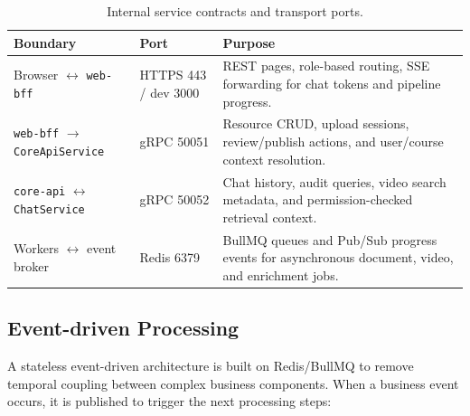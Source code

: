 \begin{table}[H]
    \centering
    \caption{Internal service contracts and transport ports.}
    \label{tab:grpc-service-summary}
    \begin{tabular}{|p{3.2cm}|p{2.6cm}|p{7.2cm}|}
        \hline
        \textbf{Boundary} & \textbf{Port} & \textbf{Purpose} \\
        \hline
        Browser $\leftrightarrow$ \texttt{web-bff}
            & HTTPS 443 / dev 3000
            & REST pages, role-based routing, SSE forwarding for chat tokens
              and pipeline progress. \\
        \hline
        \texttt{web-bff} $\to$ \texttt{CoreApiService}
            & gRPC 50051
            & Resource CRUD, upload sessions, review/publish actions, and
              user/course context resolution. \\
        \hline
        \texttt{core-api} $\leftrightarrow$ \texttt{ChatService}
            & gRPC 50052
            & Chat history, audit queries, video search metadata, and
              permission-checked retrieval context. \\
        \hline
        Workers $\leftrightarrow$ event broker
            & Redis 6379
            & BullMQ queues and Pub/Sub progress events for asynchronous
              document, video, and enrichment jobs. \\
        \hline
    \end{tabular}
\end{table}

\subsection{Event-driven Processing}

A stateless event-driven architecture is built on Redis/BullMQ to remove
temporal coupling between complex business components. When a business
event occurs, it is published to trigger the next processing steps:

